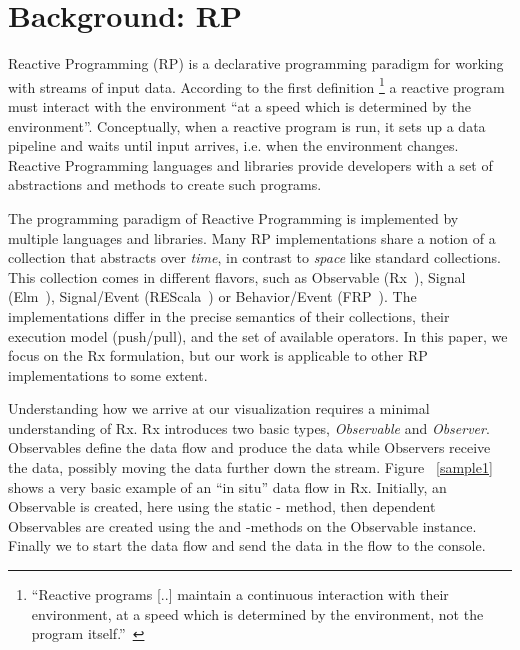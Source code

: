 \section{Background:  RP}%
\label{background}%
\label{nutshell}

Reactive Programming (RP) is a declarative programming paradigm for
working with streams of input data.  According to the first definition%
\footnote{ ``Reactive programs [..] maintain a continuous interaction
with their environment, at a speed which is determined by the
environment, not the program itself.''~\cite{berry1989real} } a reactive
program must interact with the environment ``at a speed which is
determined by the environment''.  Conceptually, when a reactive program
is run, it sets up a data pipeline and waits until input arrives, i.e.
when the environment changes.  Reactive Programming languages and
libraries provide developers with a set of abstractions and methods to
create such programs.

The programming paradigm of Reactive Programming is implemented by
multiple languages and libraries.  Many RP implementations share a
notion of a collection that abstracts over \emph{time}, in contrast to
\emph{space} like standard collections.  This collection comes in
different flavors, such as Observable (Rx~\cite{meijer2010subject}),
Signal (Elm~\cite{czaplicki2012elm}), Signal/Event (REScala~\cite{salvaneschi2014rescala})
or Behavior/Event (FRP~\cite {elliott1997functional}).  The
implementations differ in the precise semantics of their collections,
their execution model (push/pull), and the set of available operators.
In this paper, we focus on the Rx formulation, but our work is
applicable to other RP implementations to some extent.

Understanding how we arrive at our visualization requires a minimal
understanding of Rx.  Rx introduces two basic types, \emph{Observable}
and \emph{Observer}.  Observables define the data flow and produce the
data while Observers receive the data, possibly moving the data further
down the stream.  Figure~%
\ref{sample1} shows a very basic example of an ``in situ'' data flow in
Rx.  Initially, an Observable is created, here using the static -%
method, then dependent Observables are created using the  and
-methods on the Observable instance.  Finally we 
to start the data flow and send the data in the flow to the console.

